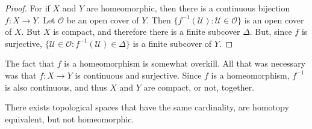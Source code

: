 \documentclass{article}                                                        %
\begin{document}
        \begin{proof}
            For if $X$ and $Y$ are homeomorphic, then there
            is a continuous bijection $f:X\rightarrow{Y}$.
            Let $\mathcal{O}$ be an open cover of $Y$.
            Then $\{f^{-1}(\mathcal{U}):\mathcal{U}\in\mathcal{O}\}$
            is an open cover of $X$. But $X$ is compact, and therefore
            there is a finite subcover $\Delta$. But, since $f$ is
            surjective,
            $\{\mathcal{U}\in\mathcal{O}:f^{-1}(\mathcal{U})\in\Delta\}$
            is a finite subcover of $Y$.
        \end{proof}
        The fact that $f$ is a homeomorphism is somewhat overkill.
        All that was necessary was that $f:X\rightarrow{Y}$ is continuous
        and surjective. Since $f$ is a homeomorphism, $f^{-1}$ is also
        continuous, and thus $X$ and $Y$ are compact, or not, together.
        \begin{theorem}
            \label{thm:Homotopy_Equivalance_of_Plane_without_point_%
                   and_unit_disc_but_not_homeomorphic}
            There exists topological spaces that have the same cardinality,
            are homotopy equivalent, but not homeomorphic.
        \end{theorem}
\end{document}
